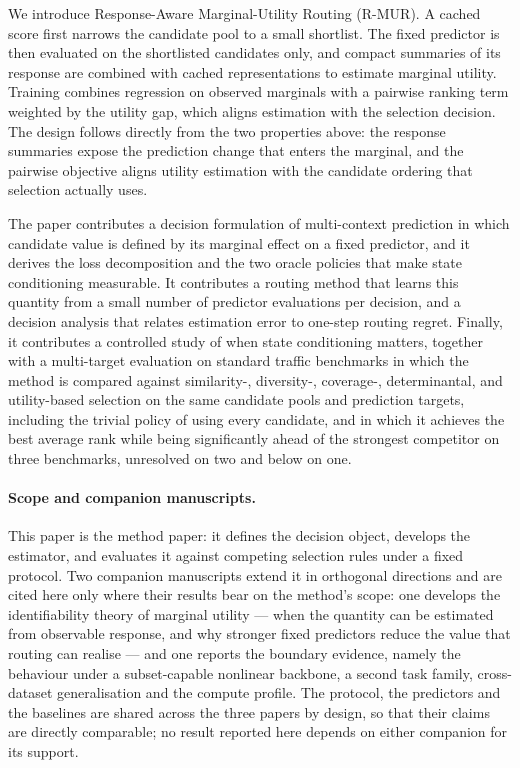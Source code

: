 We introduce Response-Aware Marginal-Utility Routing (R-MUR). A cached score
first narrows the candidate pool to a small shortlist. The fixed predictor is
then evaluated on the shortlisted candidates only, and compact summaries of
its response are combined with cached representations to estimate marginal
utility. Training combines regression on observed marginals with a pairwise
ranking term weighted by the utility gap, which aligns estimation with the
selection decision. The design follows directly from the two properties above:
the response summaries expose the prediction change that enters the marginal,
and the pairwise objective aligns utility estimation with the candidate
ordering that selection actually uses.

The paper contributes a decision formulation of multi-context prediction in
which candidate value is defined by its marginal effect on a fixed predictor,
and it derives the loss decomposition and the two oracle policies that make
state conditioning measurable. It contributes a routing method that learns
this quantity from a small number of predictor evaluations per decision, and a
decision analysis that relates estimation error to one-step routing regret.
Finally, it contributes a controlled study of when state conditioning matters,
together with a multi-target evaluation on standard traffic benchmarks in
which the method is compared against similarity-, diversity-, coverage-,
determinantal, and utility-based selection on the same candidate pools and
prediction targets, including the trivial policy of using every candidate, and
in which it achieves the best average rank while being significantly ahead of
the strongest competitor on three benchmarks, unresolved on two and below on
one.

\paragraph{Scope and companion manuscripts.} This paper is the method paper:
it defines the decision object, develops the estimator, and evaluates it
against competing selection rules under a fixed protocol. Two companion
manuscripts extend it in orthogonal directions and are cited here only where
their results bear on the method's scope: one develops the identifiability
theory of marginal utility --- when the quantity can be estimated from
observable response, and why stronger fixed predictors reduce the value that
routing can realise --- and one reports the boundary evidence, namely the
behaviour under a subset-capable nonlinear backbone, a second task family,
cross-dataset generalisation and the compute profile. The protocol, the
predictors and the baselines are shared across the three papers by design, so
that their claims are directly comparable; no result reported here depends on
either companion for its support.
